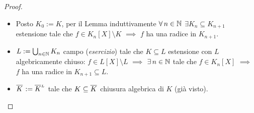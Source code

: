 \begin{proof}
\begin{itemize}
\item Posto \(K_0:=K\), per il Lemma induttivamente \(\all n\in\N\) \(\exi K_n\subseteq K_{n+1}\) estensione tale che \(f\in K_n[X]\setminus K\) \(\implies\) \(f\) ha una radice in \(K_{n+1}\).
\item \(L:=\bigcup_{n\in\N}K_n\) campo ({\em esercizio}) tale che \(K\subseteq L\) estensione con \(L\) algebricamente chiuso: \(f\in L[X]\setminus L\) \(\implies\) \(\exi n\in\N\) tale che \(f\in K_n[X]\) \(\implies\) \(f\) ha una radice in \(K_{n+1}\subseteq L\).
\item \(\calg{K}:=\calg[L]{K}\) tale che \(K\subseteq\calg{K}\) chiusura algebrica di \(K\) (gi\`a visto). \qedhere
\end{itemize}
\end{proof}


